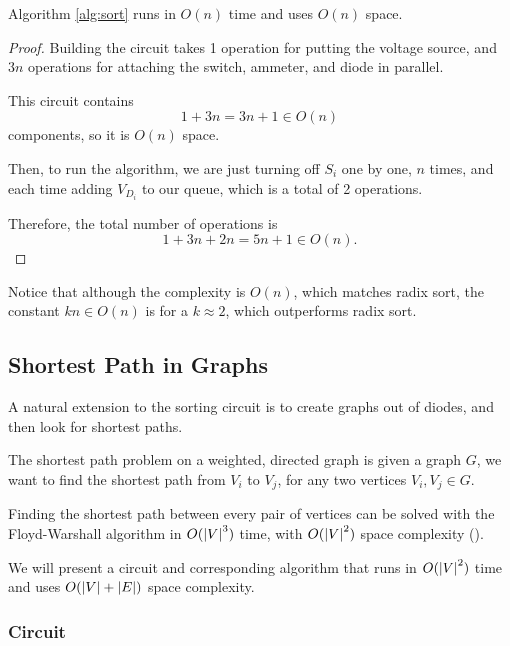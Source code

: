\begin{theorem}
  Algorithm \ref{alg:sort} runs in $O(n)$ time and uses $O(n)$ space.
\end{theorem}

\begin{proof}
  Building the circuit takes 1 operation for putting the voltage source, and $3n$ operations for
  attaching the switch, ammeter, and diode in parallel.

  This circuit contains
  \begin{equation}
    1 + 3n  = 3n + 1 \in O(n)
  \end{equation}
  components, so it is $O(n)$ space.

  Then, to run the algorithm, we are just turning off $S_i$ one by one, $n$
  times, and each time adding $V_{D_i}$ to our queue, which is a total of 2
  operations.

  Therefore, the total number of operations is
  \begin{equation}
    1 + 3n + 2n = 5n+1 \in O(n).
  \end{equation}
\end{proof}

Notice that although the complexity is $O(n)$, which matches radix sort,
the constant $kn \in O(n)$ is for a $k \approx 2$, which outperforms radix sort.

\subsection{Shortest Path in Graphs}
A natural extension to the sorting circuit is to create graphs out of diodes,
and then look for shortest paths.

\begin{definition}
  The shortest path problem on a weighted, directed graph is given a graph $G$, we want to find the shortest path from $V_i$ to $V_j$, for any two vertices $V_i, V_j \in G$.
\end{definition}

Finding the shortest path between every pair of vertices can be solved with the Floyd-Warshall algorithm in $O(\abs{V}^3)$ time, with $O(\abs{V}^2)$ space complexity (\cite{floyd_algorithm}).

We will present a circuit and corresponding algorithm that runs in $O(\abs{V}^2)$ time and
uses $O(\abs{V} + \abs{E})$ space complexity.

\subsubsection{Circuit}

